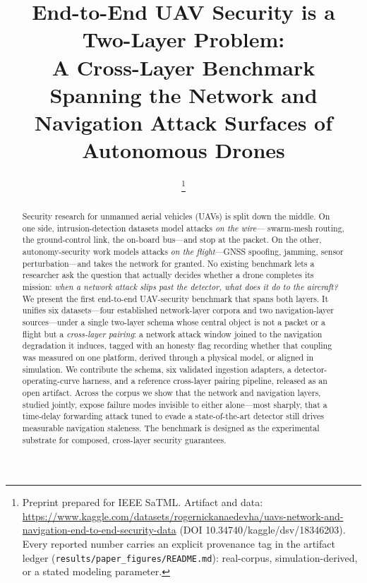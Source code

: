 \documentclass[conference]{IEEEtran}
\newcommand{\code}[1]{\texttt{#1}}
\begin{document}
\title{End-to-End UAV Security is a Two-Layer Problem:\\
A Cross-Layer Benchmark Spanning the Network and\\ Navigation Attack Surfaces of Autonomous Drones}

\author{
\thanks{Preprint prepared for IEEE SaTML. Artifact and data:
\url{https://www.kaggle.com/datasets/rogernickanaedevha/uavs-network-and-navigation-end-to-end-security-data} (DOI 10.34740/kaggle/dsv/18346203).
Every reported number carries an explicit provenance tag in the artifact ledger
(\code{results/paper\_figures/README.md}): real-corpus, simulation-derived, or a
stated modeling parameter.}}

\maketitle

\begin{abstract}
Security research for unmanned aerial vehicles (UAVs) is split down the middle.
On one side, intrusion-detection datasets model attacks \emph{on the wire}---
swarm-mesh routing, the ground-control link, the on-board bus---and stop at the
packet. On the other, autonomy-security work models attacks \emph{on the
flight}---GNSS spoofing, jamming, sensor perturbation---and takes the network
for granted. No existing benchmark lets a researcher ask the question that
actually decides whether a drone completes its mission: \emph{when a network
attack slips past the detector, what does it do to the aircraft?} We present the
first end-to-end UAV-security benchmark that spans both layers. It unifies six
datasets---four established network-layer corpora and two navigation-layer
sources---under a single two-layer schema whose central object is not a packet
or a flight but a \emph{cross-layer pairing}: a network attack window joined to
the navigation degradation it induces, tagged with an honesty flag recording
whether that coupling was measured on one platform, derived through a physical
model, or aligned in simulation. We contribute the schema, six validated
ingestion adapters, a detector-operating-curve harness, and a reference
cross-layer pairing pipeline, released as an open artifact. Across the corpus we
show that the network and navigation layers, studied jointly, expose failure
modes invisible to either alone---most sharply, that a time-delay forwarding
attack tuned to evade a state-of-the-art detector still drives measurable
navigation staleness. The benchmark is designed as the experimental substrate
for composed, cross-layer security guarantees.
\end{abstract}
\end{document}
